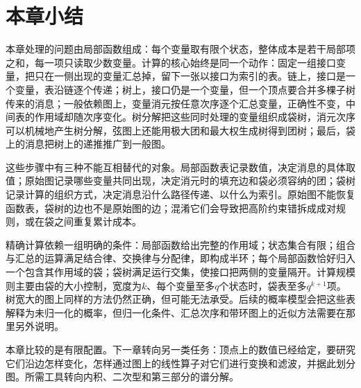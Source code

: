 
\section{本章小结}
\label{sec:graph-dp-summary}

本章处理的问题由局部函数组成：每个变量取有限个状态，整体成本是若干局部项之和，每一项只读取少数变量。计算的核心始终是同一个动作：固定一组接口变量，把只在一侧出现的变量汇总掉，留下一张以接口为索引的表。链上，接口是一个变量，表沿链逐个传递；树上，接口仍是一个变量，但一个顶点要合并多棵子树传来的消息；一般依赖图上，变量消元按任意次序逐个汇总变量，正确性不变，中间表的作用域却随次序变化。树分解把这些同时处理的变量组织成袋树，消元次序可以机械地产生树分解，弦图上还能用极大团和最大权生成树得到团树；最后，袋上的消息把树上的递推推广到一般图。

这些步骤中有三种不能互相替代的对象。局部函数表记录数值，决定消息的具体取值；原始图记录哪些变量共同出现，决定消元时的填充边和袋必须容纳的团；袋树记录计算的组织方式，决定消息沿什么路径传递、以什么为索引。原始图不能恢复函数表，袋树的边也不是原始图的边；混淆它们会导致把高阶约束错拆成成对规则，或在袋之间重复累计成本。

精确计算依赖一组明确的条件：局部函数给出完整的作用域；状态集合有限；组合与汇总的运算满足结合律、交换律与分配律，即构成半环；每个局部函数恰好归入一个包含其作用域的袋；袋树满足运行交集，使接口把两侧的变量隔开。计算规模则主要由袋的大小控制，宽度为$k$、每个变量至多$q$个状态时，袋表至多$q^{k+1}$项。树宽大的图上同样的方法仍然正确，但可能无法承受。后续的概率模型会把这些表解释为未归一化的概率，但归一化条件、汇总次序和带环图上的近似方法需要在那里另外说明。

本章比较的是有限配置。下一章转向另一类任务：顶点上的数值已经给定，要研究它们沿边怎样变化，怎样通过图上的线性算子对它们进行变换和滤波，并据此划分图。所需工具转向内积、二次型和第三部分的谱分解。
